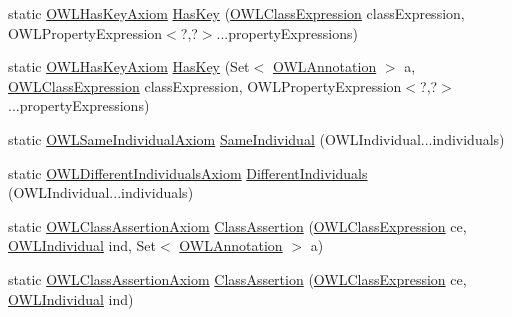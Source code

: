 \begin{DoxyCompactItemize}
\item 
static \hyperlink{interfaceorg_1_1semanticweb_1_1owlapi_1_1model_1_1_o_w_l_has_key_axiom}{O\-W\-L\-Has\-Key\-Axiom} \hyperlink{classorg_1_1semanticweb_1_1owlapi_1_1apibinding_1_1_o_w_l_functional_syntax_factory_aaa251f28187ea59e187a8e72a5bb842e}{Has\-Key} (\hyperlink{interfaceorg_1_1semanticweb_1_1owlapi_1_1model_1_1_o_w_l_class_expression}{O\-W\-L\-Class\-Expression} class\-Expression, O\-W\-L\-Property\-Expression$<$?,?$>$...property\-Expressions)
\item 
static \hyperlink{interfaceorg_1_1semanticweb_1_1owlapi_1_1model_1_1_o_w_l_has_key_axiom}{O\-W\-L\-Has\-Key\-Axiom} \hyperlink{classorg_1_1semanticweb_1_1owlapi_1_1apibinding_1_1_o_w_l_functional_syntax_factory_af9d576e7456d4864807ed888e32a7151}{Has\-Key} (Set$<$ \hyperlink{interfaceorg_1_1semanticweb_1_1owlapi_1_1model_1_1_o_w_l_annotation}{O\-W\-L\-Annotation} $>$ a, \hyperlink{interfaceorg_1_1semanticweb_1_1owlapi_1_1model_1_1_o_w_l_class_expression}{O\-W\-L\-Class\-Expression} class\-Expression, O\-W\-L\-Property\-Expression$<$?,?$>$...property\-Expressions)
\item 
static \hyperlink{interfaceorg_1_1semanticweb_1_1owlapi_1_1model_1_1_o_w_l_same_individual_axiom}{O\-W\-L\-Same\-Individual\-Axiom} \hyperlink{classorg_1_1semanticweb_1_1owlapi_1_1apibinding_1_1_o_w_l_functional_syntax_factory_a69d50cd8ab21ad1ba71ebd00a7b6a6dc}{Same\-Individual} (O\-W\-L\-Individual...\-individuals)
\item 
static \hyperlink{interfaceorg_1_1semanticweb_1_1owlapi_1_1model_1_1_o_w_l_different_individuals_axiom}{O\-W\-L\-Different\-Individuals\-Axiom} \hyperlink{classorg_1_1semanticweb_1_1owlapi_1_1apibinding_1_1_o_w_l_functional_syntax_factory_af807ee28dbf1ff4efcf1396ee737f2f1}{Different\-Individuals} (O\-W\-L\-Individual...\-individuals)
\item 
static \hyperlink{interfaceorg_1_1semanticweb_1_1owlapi_1_1model_1_1_o_w_l_class_assertion_axiom}{O\-W\-L\-Class\-Assertion\-Axiom} \hyperlink{classorg_1_1semanticweb_1_1owlapi_1_1apibinding_1_1_o_w_l_functional_syntax_factory_a25ddaecbf74829053eabc861595b839a}{Class\-Assertion} (\hyperlink{interfaceorg_1_1semanticweb_1_1owlapi_1_1model_1_1_o_w_l_class_expression}{O\-W\-L\-Class\-Expression} ce, \hyperlink{interfaceorg_1_1semanticweb_1_1owlapi_1_1model_1_1_o_w_l_individual}{O\-W\-L\-Individual} ind, Set$<$ \hyperlink{interfaceorg_1_1semanticweb_1_1owlapi_1_1model_1_1_o_w_l_annotation}{O\-W\-L\-Annotation} $>$ a)
\item 
static \hyperlink{interfaceorg_1_1semanticweb_1_1owlapi_1_1model_1_1_o_w_l_class_assertion_axiom}{O\-W\-L\-Class\-Assertion\-Axiom} \hyperlink{classorg_1_1semanticweb_1_1owlapi_1_1apibinding_1_1_o_w_l_functional_syntax_factory_a760ee49ca673572e63fd6a65618d39bc}{Class\-Assertion} (\hyperlink{interfaceorg_1_1semanticweb_1_1owlapi_1_1model_1_1_o_w_l_class_expression}{O\-W\-L\-Class\-Expression} ce, \hyperlink{interfaceorg_1_1semanticweb_1_1owlapi_1_1model_1_1_o_w_l_individual}{O\-W\-L\-Individual} ind)

\end{DoxyCompactItemize}
